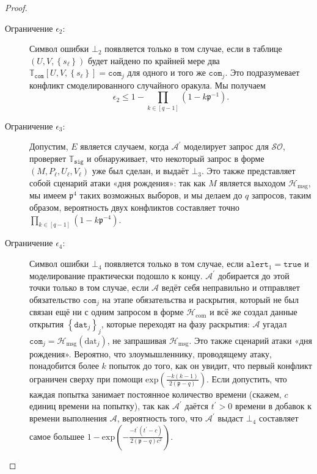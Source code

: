\documentclass{mrl}
\theoremstyle{definition}
\numberwithin{theorem}{subsection}
\newcommand{\adversary}{\mathcal{A}}
\begin{document}
\begin{proof}
\begin{description}
\item [Ограничение $\epsilon_2$:] Символ ошибки $\bot_2$ появляется только в том случае, если в таблице $(U, V, \left\{s_\ell\right\})$ будет найдено по крайней мере два $\mathbb{T}_{\texttt{com}}[U,V,\left\{s_\ell\right\}] = \texttt{com}_j$ для одного и того же $\texttt{com}_j$. Это подразумевает конфликт смоделированного случайного оракула. Мы получаем
\[\epsilon_2 \leq 1 - \prod_{k \in [q-1]} (1-k\mathfrak{p}^{-1}).\]

\item [Ограничение $\epsilon_3$:] Допустим, $E$ является случаем, когда $\adversary^\prime$ моделирует запрос для $\mathcal{SO}$, проверяет $\mathbb{T}_{\texttt{sig}}$ и обнаруживает, что некоторый запрос в форме $(M, P_\ell, U_\ell, V_\ell)$ уже был сделан, и выдаёт $\bot_3$. Это также представляет собой сценарий атаки «дня рождения»: так как $M$ является выходом $\mathcal{H}_{\text{msg}}$, мы имеем $\mathfrak{p}^{4}$ таких возможных выборов, и мы делаем до $q$ запросов, таким образом, вероятность двух конфликтов составляет точно $\prod_{k \in [q-1]}(1 - k\mathfrak{p}^{-4})$.

\item [Ограничение $\epsilon_4$:] Символ ошибки $\bot_4$ появляется только в том случае, если $\texttt{alert}_1 = \texttt{true}$ и моделирование практически подошло к концу. $\adversary^\prime$ добирается до этой точки только в том случае, если $\adversary$ ведёт себя неправильно и отправляет обязательство $\texttt{com}_j$ на этапе обязательства и раскрытия, который не был связан ещё ни с одним запросом в форме $\mathcal{H}_{\text{com}}$ и всё же создал данные открытия $\left\{\texttt{dat}_j\right\}_j$, которые переходят на фазу раскрытия: $\adversary$ угадал $\texttt{com}_j = \mathcal{H}_{\text{msg}}(\text{dat}_j)$, не запрашивая $\mathcal{H}_{\text{msg}}$. Это также сценарий атаки «дня рождения». Вероятно, что злоумышленнику, проводящему атаку, понадобится более $k$ попыток до того, как он увидит, что первый конфликт ограничен сверху при помощи $\text{exp}(\frac{-k(k-1)}{2(\mathfrak{p}-q)})$. Если допустить, что каждая попытка занимает постоянное количество времени (скажем, $c$ единиц времени на попытку), так как $\adversary^\prime$ даётся $t^\prime > 0$ времени в добавок к времени выполнения $\adversary$, вероятность того, что $\adversary^\prime$ выдаст $\bot_4$ составляет самое большее $1 - \text{exp}(-\frac{-t^\prime(t^\prime-c)}{2(\mathfrak{p}-q)c^2})$.
\end{description}
\end{proof}
\end{document}
